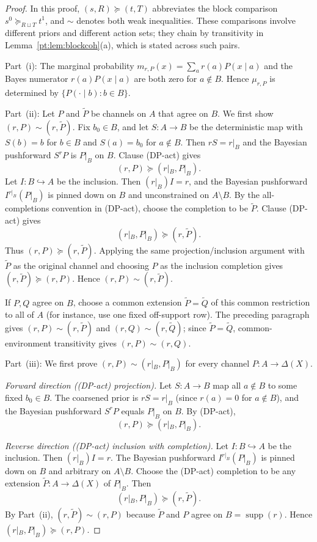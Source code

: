 \documentclass[11pt,a4paper]{article}
\theoremstyle{definition}
\newcommand{\1}{\mathbf 1}
\begin{document}
\begin{proof}
In this proof, $(s,R)\succeq(t,T)$ abbreviates the block comparison
$s^0\succeq_{R\sqcup T}t^1$, and $\sim$ denotes both weak inequalities.  These comparisons involve different priors and
different action sets; they chain by transitivity in Lemma~\ref{pt:lem:blockcoh}(a), which is stated across such pairs.

Part~(i): The marginal probability $m_{r,P}(x)=\sum_a r(a)P(x\mid a)$ and the Bayes numerator $r(a)P(x\mid a)$ are both
zero for $a\notin B$.  Hence $\mu_{r,P}$ is determined by $\{P(\cdot\mid b):b\in B\}$.

Part~(ii): Let $P$ and $\widetilde P$ be channels on $A$ that agree on $B$.  We first show
$(r,P)\sim(r,\widetilde P)$.  Fix $b_0\in B$, and let $S:A\to B$ be the deterministic map with $S(b)=b$ for $b\in B$
and $S(a)=b_0$ for $a\notin B$.  Then $rS=r|_B$ and the Bayesian pushforward $S^rP$ is $P|_B$ on $B$.  Clause \textup{(DP-act)}
gives
\[
(r,P)\succeq(r|_B,P|_B).
\]
Let $I:B\hookrightarrow A$ be the inclusion.  Then $(r|_B)I=r$, and the Bayesian pushforward $I^{r|_B}(P|_B)$ is
pinned down on $B$ and unconstrained on $A\setminus B$.  By the all-completions convention in \textup{(DP-act)}, choose
the completion to be $\widetilde P$.  Clause \textup{(DP-act)} gives
\[
(r|_B,P|_B)\succeq(r,\widetilde P).
\]
Thus $(r,P)\succeq(r,\widetilde P)$.  Applying the same projection/inclusion argument with $\widetilde P$ as the original
channel and choosing $P$ as the inclusion completion gives $(r,\widetilde P)\succeq(r,P)$.  Hence
$(r,P)\sim(r,\widetilde P)$.

If $P,Q$ agree on $B$, choose a common extension $\widetilde P=\widetilde Q$ of this common restriction to all of $A$
(for instance, use one fixed off-support row).  The preceding paragraph gives
$(r,P)\sim(r,\widetilde P)$ and $(r,Q)\sim(r,\widetilde Q)$; since $\widetilde P=\widetilde Q$, common-environment
transitivity gives $(r,P)\sim(r,Q)$.

Part~(iii): We first prove $(r,P)\sim(r|_B,P|_B)$ for every channel $P:A\to\Delta(X)$.

\emph{Forward direction (\textup{(DP-act)} projection).}  Let $S:A\to B$ map all $a\notin B$ to some fixed $b_0\in B$.  The coarsened
prior is $rS=r|_B$ (since $r(a)=0$ for $a\notin B$), and the Bayesian pushforward $S^rP$ equals $P|_B$ on $B$.  By
\textup{(DP-act)},
\[
(r,P)\succeq(r|_B,P|_B).
\]

\emph{Reverse direction (\textup{(DP-act)} inclusion with completion).}  Let $I:B\hookrightarrow A$ be the inclusion.  Then
$(r|_B)I=r$.  The Bayesian pushforward $I^{r|_B}(P|_B)$ is pinned down on $B$ and arbitrary on $A\setminus B$.  Choose
the \textup{(DP-act)} completion to be any extension $\widetilde P:A\to\Delta(X)$ of $P|_B$.  Then
\[
(r|_B,P|_B)\succeq(r,\widetilde P).
\]
By Part~(ii), $(r,\widetilde P)\sim(r,P)$ because $\widetilde P$ and $P$ agree on $B=\operatorname{supp}(r)$.  Hence
$(r|_B,P|_B)\succeq(r,P)$.


\end{proof}
\end{document}
